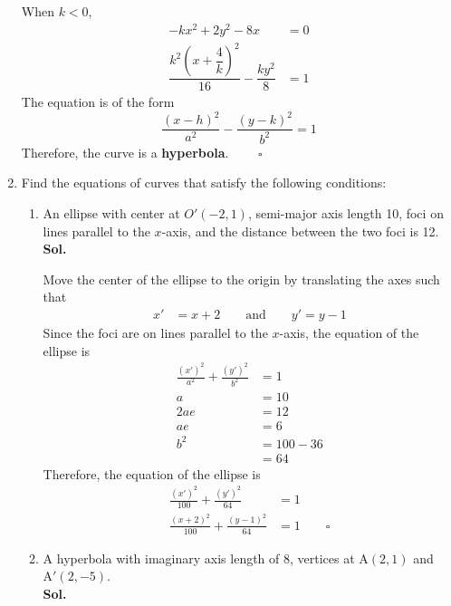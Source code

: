 \documentclass{report}
\newcommand{\sol}{\vspace{1em}\\\textbf{Sol.}}
\newcommand{\eos}{ \qquad \square}
\begin{document}
\begin{enumerate}
          When $k<0$,
          \begin{align*}
              -kx^2+2y^2-8x                                                    & = 0 \\
              \dfrac{k^2\left(x + \dfrac{4}{k}\right)^2}{16} - \dfrac{ky^2}{8} & = 1
          \end{align*}
          The equation is of the form
          \begin{equation*}
              \frac{(x-h)^2}{a^2} - \frac{(y-k)^2}{b^2} = 1
          \end{equation*}
          Therefore, the curve is a \textbf{hyperbola}. $\eos$

          \newpage
    \item Find the equations of curves that satisfy the following conditions:
          \begin{enumerate}
              \item An ellipse with center at $O'(-2,1)$, semi-major axis length 10, foci on lines
                    parallel to the $x$-axis, and the distance between the two foci is 12. \sol{}

                    Move the center of the ellipse to the origin by translating the axes such that
                    \begin{align*}
                        x' & = x + 2 \qquad \text{and} \qquad y' = y - 1
                    \end{align*}
                    Since the foci are on lines parallel to the $x$-axis, the equation of the ellipse is
                    \begin{align*}
                        \frac{(x')^2}{a^2} + \frac{(y')^2}{b^2} & = 1        \\
                        a                                       & = 10       \\
                        2ae                                     & = 12       \\
                        ae                                      & = 6        \\
                        b^2                                     & = 100 - 36 \\
                                                                & = 64
                    \end{align*}
                    Therefore, the equation of the ellipse is
                    \begin{align*}
                        \frac{(x')^2}{100} + \frac{(y')^2}{64}   & = 1      \\
                        \frac{(x+2)^2}{100} + \frac{(y-1)^2}{64} & = 1 \eos
                    \end{align*}
              \item A hyperbola with imaginary axis length of 8, vertices at $\mathrm{A}(2,1)$ and
                    $\mathrm{A}'(2,-5)$. \sol{}


\end{enumerate}
\end{enumerate}
\end{document}
